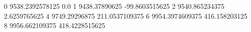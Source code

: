 0 9538.2392578125 0.0
1 9438.37890625 -99.8603515625
2 9540.865234375 2.6259765625
4 9749.29296875 211.0537109375
6 9954.3974609375 416.158203125
8 9956.662109375 418.4228515625
